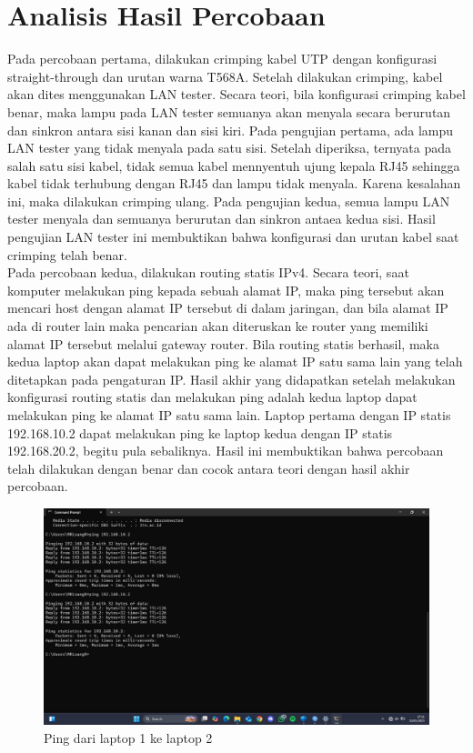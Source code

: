 \section{Analisis Hasil Percobaan}
Pada percobaan pertama, dilakukan crimping kabel UTP dengan konfigurasi straight-through dan urutan warna T568A. Setelah dilakukan crimping, kabel akan dites menggunakan LAN tester. Secara teori, bila konfigurasi crimping kabel benar, maka lampu pada LAN tester semuanya akan menyala secara berurutan dan sinkron antara sisi kanan dan sisi kiri. Pada pengujian pertama, ada lampu LAN tester yang tidak menyala pada satu sisi. Setelah diperiksa, ternyata pada salah satu sisi kabel, tidak semua kabel mennyentuh ujung kepala RJ45 sehingga kabel tidak terhubung dengan RJ45 dan lampu tidak menyala. Karena kesalahan ini, maka dilakukan crimping ulang. Pada pengujian kedua, semua lampu LAN tester menyala dan semuanya berurutan dan sinkron antaea kedua sisi. Hasil pengujian LAN tester ini membuktikan bahwa konfigurasi dan urutan kabel saat crimping telah benar.
\\
\indent
Pada percobaan kedua, dilakukan routing statis IPv4. Secara teori, saat komputer melakukan ping kepada sebuah alamat IP, maka ping tersebut akan mencari host dengan alamat IP tersebut di dalam jaringan, dan bila alamat IP ada di router lain maka pencarian akan diteruskan ke router yang memiliki alamat IP tersebut melalui gateway router. Bila routing statis berhasil, maka kedua laptop akan dapat melakukan ping ke alamat IP satu sama lain yang telah ditetapkan pada pengaturan IP. Hasil akhir yang didapatkan setelah melakukan konfigurasi routing statis dan melakukan ping adalah kedua laptop dapat melakukan ping ke alamat IP satu sama lain. Laptop pertama dengan IP statis 192.168.10.2 dapat melakukan ping ke laptop kedua dengan IP statis 192.168.20.2, begitu pula sebaliknya. Hasil ini membuktikan bahwa percobaan telah dilakukan dengan benar dan cocok antara teori dengan hasil akhir percobaan.
\begin{figure}[H]
	\centering
	\includegraphics[scale=0.5]{P1/img/ping 10.2.jpg}
	\caption{Ping dari laptop 1 ke laptop 2}
\end{figure}
